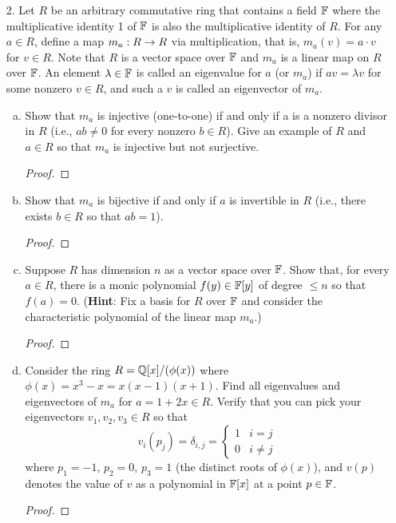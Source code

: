 \begin{itemize}
\begin{enumerate}[(a)]
\begin{proof}
\end{proof}
\end{enumerate}








\item[2.] Let $R$ be an arbitrary commutative ring that contains a field $\mathbb{F}$ where the multiplicative identity 1 of $\mathbb{F}$ is also the multiplicative identity of $R$. For any $a \in R$, define a map $m_a : R \rightarrow R$ via multiplication, that is, $m_a(v) = a \cdot v$ for $v \in R$.
Note that $R$ is a vector space over $\mathbb{F}$ and $m_a$ is a linear map on $R$ over $\mathbb{F}$. 
An element $\lambda \in \mathbb{F}$ is called an eigenvalue for $a$ (or $m_a$) if $av = \lambda v$ for some nonzero
$v \in R$, and such a $v$ is called an eigenvector of $m_a$.
\begin{enumerate}[(a)]
\item Show that $m_a$ is injective (one-to-one) if and only if a is a nonzero
divisor in $R$ (i.e., $ab \neq 0$ for every nonzero $b \in R$). Give an example of $R$ and
$a \in R$ so that $m_a$ is injective but not surjective.
\begin{proof}

\end{proof}

\item Show that $m_a$ is bijective if and only if $a$ is invertible in $R$ (i.e., there
exists $b \in R$ so that $ab = 1$).
\begin{proof}

\end{proof}

\item Suppose $R$ has dimension $n$ as a vector space over $\mathbb{F}$. Show that, for
every $a \in R$, there is a monic polynomial $f(y) \in \mathbb{F}[y]$ of degree $\leq n$ so that
$f(a) = 0$. (\textbf{Hint}: Fix a basis for $R$ over $\mathbb{F}$ and consider the characteristic
polynomial of the linear map $m_a$.)
\begin{proof}

\end{proof}

\item Consider the ring $R = \mathbb{Q}[x]/(\phi(x))$ where $\phi(x) = x^3-x = x(x-1)(x+1)$. Find all eigenvalues and eigenvectors of $m_a$ for $a = 1 + 2x \in R$. Verify
that you can pick your eigenvectors $v_1, v_2, v_3 \in R$ so that
\begin{equation*}
v_i (p_j) = \delta_{i,j} =  \left\{
        \begin{array}{ll}
            1 & i=j \\
            0 & i \neq j 
        \end{array}
    \right.
\end{equation*}
where $p_1 = -1$, $p_2 = 0$, $p_3 = 1$ (the distinct roots of $\phi(x)$), and $v(p)$ denotes
the value of $v$ as a polynomial in $\mathbb{F}[x]$ at a point $p \in \mathbb{F}$.
\begin{proof}


\end{proof}
\end{enumerate}
\end{itemize}
